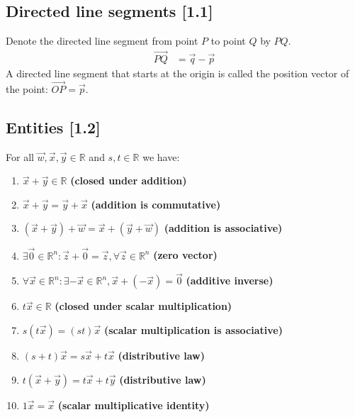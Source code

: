 \documentclass[a4paper,9pt]{extarticle}
\begin{document}
\begin{multicols*}{2}

\subsection{Directed line segments [1.1]}
Denote the directed line segment from point $P$ to point $Q$ by $PQ$.
\begin{equation} \label{1.1-3}
    \begin{split}
        \vec{PQ} & = \vec{q} - \vec{p}
    \end{split}
\end{equation}
A directed line segment that starts at the origin is called the position vector of the point: $\vec{OP} = \vec{p}$.


\subsection{Entities [1.2]}
For all $\vec{w}, \vec{x}, \vec{y} \in \mathbb{R}$ and $s,t \in \mathbb{R}$ we have:
\begin{enumerate}[label=\bfseries (\arabic*)] \itemsep0pt \parskip0pt 
    \item $\vec{x} + \vec{y} \in \mathbb{R}$ \textbf{(closed under addition)}
    \item $\vec{x} + \vec{y} = \vec{y} + \vec{x}$ \textbf{(addition is commutative)}
    \item $(\vec{x} + \vec{y}) + \vec{w} = \vec{x} + (\vec{y} + \vec{w})$ \textbf{(addition is associative)}
    \item $\exists \vec{0} \in \mathbb{R}^n: \vec{z} + \vec{0} = \vec{z}, \forall \vec{z} \in \mathbb{R}^n$ \textbf{(zero vector)}
    \item $\forall \vec{x} \in \mathbb{R}^n: \exists -\vec{x} \in \mathbb{R}^n, \vec{x} + (-\vec{x}) = \vec{0}$ \textbf{(additive inverse)}
    \item $t \vec{x} \in \mathbb{R}$ \textbf{(closed under scalar multiplication)}
    \item $s(t \vec{x}) = (st)\vec{x}$ \textbf{(scalar multiplication is associative)}
    \item $(s + t)\vec{x} = s \vec{x} + t \vec{x}$ \textbf{(distributive law)}
    \item $t(\vec{x} + \vec{y}) = t \vec{x} + t \vec{y}$ \textbf{(distributive law)}
    \item $1 \vec{x} = \vec{x}$ \textbf{(scalar multiplicative identity)}
\end{enumerate}


\end{multicols*}
\end{document}
